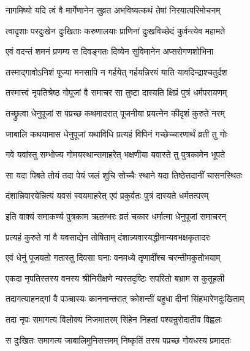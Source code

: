 \twolineshloka
{नागमिष्यो यदि त्वं वै मार्गेणानेन सुव्रत}
{अभविष्यत्कथं तेषां निरयात्परिमोचनम्}%

\twolineshloka
{त्वादृशाः परदुःखेन दुःखिताः करुणालयाः}
{प्राणिनां दुःखविच्छेदं कुर्वन्त्येव महामते}%


\twolineshloka
{एवं वदन्तं शमनं प्रणम्य स दिवङ्गतः}
{दिव्येन सुविमानेन अप्सरोगणशोभिना}%

\twolineshloka
{तस्माद्गावोऽनिशं पूज्या मनसापि न गर्हयेत्}
{गर्हयन्निरयं याति यावदिन्द्राश्चतुर्दश}%

\twolineshloka
{तस्मात्त्वं नृपतिश्रेष्ठ गोपूजां वै समाचर}
{सा तुष्टा दास्यति क्षिप्रं पुत्रं धर्मपरायणम्}%


\twolineshloka
{तच्छ्रुत्वा धेनुपूजां स पप्रच्छ कथमादरात्}
{पूजनीया प्रयत्नेन कीदृशं कुरुते नरम्}%

\twolineshloka
{जाबालि कथयामास धेनुपूजां यथाविधि}
{प्रत्यहं विपिनं गच्छेच्चारणार्थं व्रती तु गोः}%

\twolineshloka
{गवे यवांस्तु सम्भोज्य गोमयस्थान्समाहरेत्}
{भक्षणीया यवास्ते तु पुत्रकामेन भूपते}%

\twolineshloka
{सा यदा पिबते तोयं तदा पेयं जलं शुचि}
{सोच्चैः स्थाने यदा तिष्ठेत्तदानीं चासनस्थितः}%

\twolineshloka
{दंशान्निवारयेन्नित्यं यवसं स्वयमाहरेत्}
{एवं प्रकुर्वतः पुत्रं दास्यते धर्मतत्परम्}%


\twolineshloka
{इति वाक्यं समाकर्ण्य पुत्रकाम ऋतम्भरः}
{व्रतं चकार धर्मात्मा धेनुपूजां समाचरन्}%

\twolineshloka
{प्रत्यहं कुरुते गां वै यवसाद्येन तोषिताम्}
{दंशान्न्यवारयद्धीमान्यवभक्षकृतादरः}%

\twolineshloka
{एवं धेनुं पूजयतो गतास्तु दिवसा घनाः}
{वनमध्ये तृणादींश्च चरन्तीमकुतोभयाम्}%

\twolineshloka
{एकदा नृपतिस्तस्य वनस्य श्रीनिरीक्षणे}
{न्यस्तदृष्टिः सपरितो बभ्राम स कुतूहली}%

\twolineshloka
{तदागत्याहनद्गां वै पञ्चास्यः काननान्तरात्}
{क्रोशन्तीं बहुधा दीनां सिंहभारेणदुःखिताम्}%

\twolineshloka
{तदा नृपः समागत्य विलोक्य निजमातरम्}
{सिंहेन निहतां पश्यन्रुरोदातीव विह्वलः}%

\twolineshloka
{स दुःखितः समागत्य जाबालिमुनिसत्तमम्}
{निष्कृतिं तस्य पप्रच्छ गोवधस्य प्रमादतः}%


